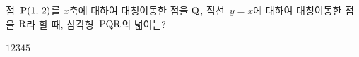 점~$\mathrm{P}(1,\mkern3mu 2)$를 $x$축에 대하여 대칭이동한 점을 $\mathrm{Q}$, 직선~$y=x$에 대하여 대칭이동한 점을 $\mathrm{R}$라 할 때, 삼각형~$\mathrm{PQR}$의 넓이는?
\begin{choices32}{$1$}{$2$}{$3$}{$4$}{$5$}\end{choices32}
